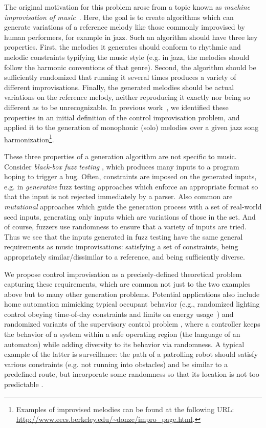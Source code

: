 \documentclass[a4paper,USenglish,numberwithinsect]{lipics}
\theoremstyle{plain}
\theoremstyle{definition}
\begin{document}
The original motivation for this problem arose from a topic known as {\em machine improvisation of
music}~\cite{rowe-2001}.  Here, the goal is to create algorithms which can generate variations of a
reference melody like those commonly improvised by human performers, for example in jazz.  Such an
algorithm should have three key properties.  First, the melodies it generates should conform to rhythmic
and melodic constraints typifying the music style (e.g. in jazz, the melodies should follow the
harmonic conventions of that genre). Second, the algorithm should be sufficiently randomized that
running it several times produces a variety of different improvisations. Finally, the generated
melodies should be actual variations on the reference melody, neither reproducing it exactly nor being
so different as to be unrecognizable. In previous work~\cite{donze-icmc14}, we identified these
properties in an initial definition of the control improvisation problem, and applied it to the
generation of monophonic (solo) melodies over a given jazz song harmonization\footnote{Examples of
improvised melodies can be found at the following URL:\\
\url{http://www.eecs.berkeley.edu/~donze/impro_page.html}.}.
 
These three properties of a generation algorithm are not specific to music.  Consider
\emph{black-box fuzz testing} \cite{fuzzing-book}, which produces many inputs to a program hoping to
trigger a bug.  Often, constraints are imposed on the generated inputs, e.g. in \emph{generative}
fuzz testing approaches which enforce an appropriate format so that the input is not rejected
immediately by a parser.  Also common are \emph{mutational} approaches which guide the generation
process with a set of real-world seed inputs, generating only inputs which are variations of those
in the set. And of course, fuzzers use randomness to ensure that a variety of inputs are tried.
Thus we see that the inputs generated in fuzz testing have the same general requirements as music
improvisations: satisfying a set of constraints, being appropriately similar/dissimilar to a
reference, and being sufficiently diverse.

We propose control improvisation as a precisely-defined theoretical problem capturing these
requirements, which are common not just to the two examples above but to many other generation
problems.  Potential applications also include home automation mimicking typical occupant behavior (e.g.,
randomized lighting control obeying time-of-day constraints and limits on energy
usage~\cite{lee-personal13}) and randomized variants of the supervisory control problem
\cite{lafortune06}, where a controller keeps the behavior of a system within a safe operating region
(the language of an automaton) while adding diversity to its behavior via randomness.  A typical example
of the latter is surveillance: the path of a patrolling robot should satisfy various constraints
(e.g. not running into obstacles) and be similar to a predefined route, but incorporate some
randomness so that its location is not too predictable \cite{lafortune-personal15}.
\end{document}
